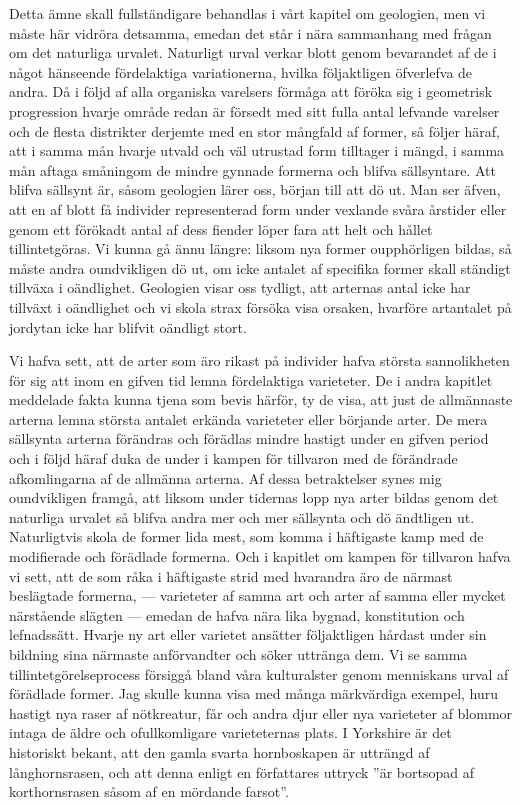 Detta ämne skall fullständigare behandlas i vårt kapitel om geologien, men vi måste här vidröra detsamma, emedan det står i nära sammanhang med frågan om det naturliga urvalet. Naturligt urval verkar blott genom bevarandet af de i något hänseende fördelaktiga variationerna, hvilka följaktligen öfverlefva de andra. Då i följd af alla organiska varelsers förmåga att föröka sig i geometrisk progression hvarje område redan är försedt med sitt fulla antal lefvande varelser och de flesta distrikter derjemte med en stor mångfald af former, så följer häraf, att i samma mån hvarje utvald och väl utrustad form tilltager i mängd, i samma mån aftaga småningom de mindre gynnade formerna och blifva sällsyntare. Att blifva sällsynt är, såsom geologien lärer oss, början till att dö ut. Man ser äfven, att en af blott få individer representerad form under vexlande svåra årstider eller genom ett förökadt antal af dess fiender löper fara att helt och hållet tillintetgöras. Vi kunna gå ännu längre: liksom nya former oupphörligen bildas, så måste andra oundvikligen dö ut, om icke antalet af specifika former skall ständigt tillväxa i oändlighet. Geologien visar oss tydligt, att arternas antal icke har tillväxt i oändlighet och vi skola strax försöka visa orsaken, hvarföre artantalet på jordytan icke har blifvit oändligt stort.

Vi hafva sett, att de arter som äro rikast på individer hafva största sannolikheten för sig att inom en gifven tid lemna fördelaktiga varieteter. De i andra kapitlet meddelade fakta kunna tjena som bevis härför, ty de visa, att just de allmännaste arterna lemna största antalet erkända varieteter eller börjande arter. De mera sällsynta arterna förändras och förädlas mindre hastigt under en gifven period och i följd häraf duka de under i kampen för tillvaron med de förändrade afkomlingarna af de allmänna arterna.
Af dessa betraktelser synes mig oundvikligen framgå, att liksom under tidernas lopp nya arter bildas genom det naturliga urvalet så blifva andra mer och mer sällsynta och dö ändtligen ut. Naturligtvis skola de former lida mest, som komma i häftigaste kamp med de modifierade och förädlade formerna. Och i kapitlet om kampen för tillvaron hafva vi sett, att de som råka i häftigaste strid med hvarandra äro de närmast beslägtade formerna, — varieteter af samma art och arter af samma eller mycket närstående slägten — emedan de hafva nära lika bygnad, konstitution och lefnadssätt. Hvarje ny art eller varietet ansätter följaktligen hårdast under sin bildning sina närmaste anförvandter och söker uttränga dem. Vi se samma tillintetgörelseprocess försiggå bland våra kulturalster genom menniskans urval af förädlade former. Jag skulle kunna visa med många märkvärdiga exempel, huru hastigt nya raser af nötkreatur, får och andra djur eller nya varieteter af blommor intaga de äldre och ofullkomligare varieteternas plats. I Yorkshire är det historiskt bekant, att den gamla svarta hornboskapen är utträngd af långhornsrasen, och att denna enligt en författares uttryck ”är bortsopad af korthornsrasen såsom af en mördande farsot”.



